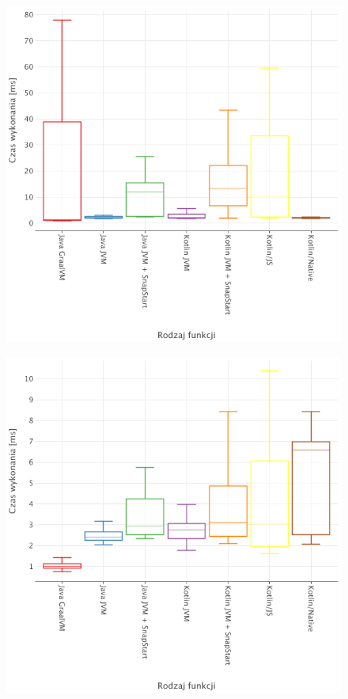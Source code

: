 \begin{figure}[htbp]
    \centering %
    \begin{minipage}[t]{0.48\textwidth} %
        \centering %
        \includegraphics[width=\linewidth]{charts/results/warm-start-boxplot-256.png}
        \label{fig:warm_start_256} %
    \end{minipage}%
    \hfill %
    \begin{minipage}[t]{0.48\textwidth}
        \centering
        \includegraphics[width=\linewidth]{charts/results/warm-start-boxplot-1024.png}

\end{minipage}
\end{figure}
